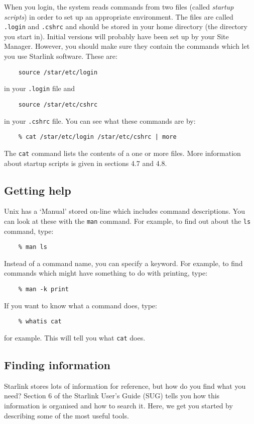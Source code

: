 \documentclass[twoside,11pt]{article}
\newcommand{\htmlref}[2]{#1}
\newcommand{\xref}[3]{#1}
\begin{document}
When you login, the system reads commands from two files (called {\em startup
scripts}) in order to set up an appropriate environment.
The files are called {\tt .login} and {\tt .cshrc} and should be stored in your
home directory (the directory you start in).
Initial versions will probably have been set up by your Site Manager.
However, you should make sure they contain the commands which let you use
Starlink software.
These are:
\begin{verbatim}
    source /star/etc/login
\end{verbatim}
in your {\tt .login} file and
\begin{verbatim}
    source /star/etc/cshrc
\end{verbatim}
in your {\tt .cshrc} file.
You can see what these commands are by:
\begin{verbatim}
    % cat /star/etc/login /star/etc/cshrc | more
\end{verbatim}
The {\tt cat} command lists the contents of a one or more files.
More information about startup scripts is given in sections
\htmlref{4.7}{ss1} and
\htmlref{4.8}{ss2}.

\subsection{Getting help}

Unix has a `Manual' stored on-line which includes command descriptions.
You can look at these with the {\tt man} command.
For example, to find out about the {\tt ls} command, type:
\begin{verbatim}
    % man ls
\end{verbatim}
Instead of a command name, you can specify a keyword.
For example, to find commands which might have something to do with printing,
type:
\begin{verbatim}
    % man -k print
\end{verbatim}
If you want to know what a command does, type:
\begin{verbatim}
    % whatis cat
\end{verbatim}
for example.
This will tell you what {\tt cat} does.

\subsection{Finding information}

Starlink stores lots of information for reference, but how do you find
what you need?
Section 6 of the Starlink User's Guide 
(\xref{SUG}{sug}{}) tells you how this
information is organised and how to search it.
Here, we get you started by describing some of the most useful tools.
\end{document}
